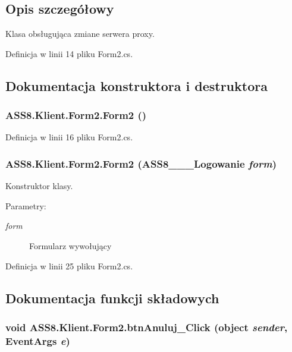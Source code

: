 \subsection{Opis szczegółowy}
Klasa obsługująca zmiane serwera proxy. 



Definicja w linii 14 pliku Form2.cs.

\subsection{Dokumentacja konstruktora i destruktora}
\hypertarget{a00004_ae4349aa452f0c374938f4ad57b3fb04}{
\subsubsection[{Form2}]{\setlength{\rightskip}{0pt plus 5cm}ASS8.Klient.Form2.Form2 ()}}
\label{d0/d0b/a00004_ae4349aa452f0c374938f4ad57b3fb04}




Definicja w linii 16 pliku Form2.cs.\hypertarget{a00004_329107a1724971156a30d347492950dd}{
\subsubsection[{Form2}]{\setlength{\rightskip}{0pt plus 5cm}ASS8.Klient.Form2.Form2 ({\bf ASS8\_\-\_\-\_\-Logowanie} {\em form})}}
\label{d0/d0b/a00004_329107a1724971156a30d347492950dd}


Konstruktor klasy. 

\begin{Desc}
\item[Parametry:]
\begin{description}
\item[{\em form}]Formularz wywołujący\end{description}
\end{Desc}


Definicja w linii 25 pliku Form2.cs.

\subsection{Dokumentacja funkcji składowych}
\hypertarget{a00004_c05c96bb15c5fcffef1fa55f7078750e}{
\subsubsection[{btnAnuluj\_\-Click}]{\setlength{\rightskip}{0pt plus 5cm}void ASS8.Klient.Form2.btnAnuluj\_\-Click (object {\em sender}, \/  EventArgs {\em e})}}
\label{d0/d0b/a00004_c05c96bb15c5fcffef1fa55f7078750e}


